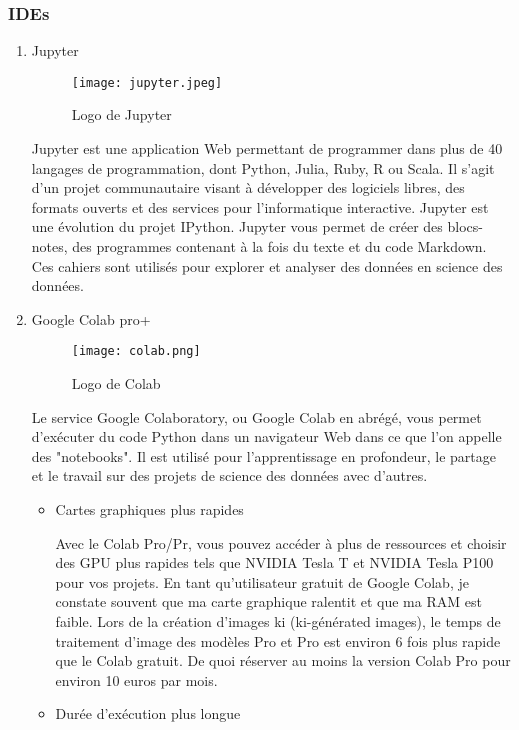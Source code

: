     \subsubsection{IDEs}
    \begin{enumerate}\bfseries
        \item Jupyter
        \begin{figure}[H]
            \centering
            \texttt{[image: jupyter.jpeg]}
            \caption{Logo de Jupyter}\label{fig:jupyter}
        \end{figure}
        \normalfont
        Jupyter est une application Web permettant de programmer dans plus de 40 langages de programmation, dont Python, Julia, Ruby, R ou  Scala. Il s'agit d'un projet communautaire visant à développer des logiciels libres, des formats ouverts et des services pour l'informatique interactive. Jupyter est une évolution du projet IPython. Jupyter vous permet de créer des blocs-notes, des programmes contenant à la fois du texte  et du code Markdown. Ces cahiers sont utilisés  pour explorer et analyser des données en science des données.

        \bfseries
        \item Google Colab pro+
        \begin{figure}[H]
            \centering
            \texttt{[image: colab.png]}
            \caption{Logo de Colab}\label{fig:colab}
        \end{figure}
        \normalfont
        Le service Google Colaboratory, ou Google Colab en abrégé, vous permet d'exécuter du code Python dans un navigateur Web dans ce que l'on appelle des "notebooks". Il est utilisé pour l'apprentissage en profondeur, le partage et le travail sur des projets de science des données avec d'autres.
        \begin{itemize}[label=$\bullet$]
            \item Cartes graphiques plus rapides
            
            Avec le Colab Pro/Pr, vous pouvez accéder à plus de ressources et  choisir des GPU plus rapides tels que NVIDIA Tesla T
            et NVIDIA Tesla P100 pour vos projets. En tant qu'utilisateur gratuit de Google Colab, je constate souvent que ma carte graphique ralentit et que ma RAM est faible. Lors de la création d'images ki (ki-générated images), le temps de traitement d'image des modèles Pro et Pro est environ 6 fois plus rapide que  le Colab gratuit. De quoi réserver au moins la version Colab Pro pour environ 10 euros par mois. 
            \item Durée d'exécution plus longue 
            

\end{itemize}
\end{enumerate}
